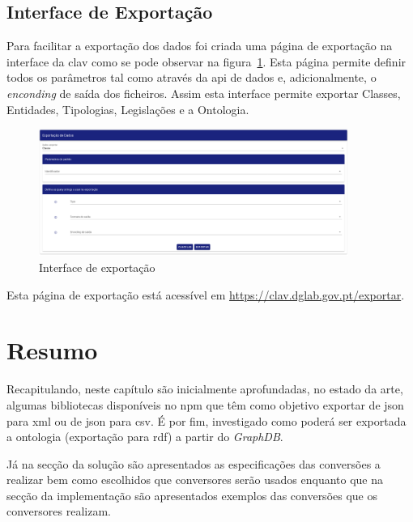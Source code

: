 \subsection{Interface de Exportação}

Para facilitar a exportação dos dados foi criada uma página de exportação na interface da \acrshort{clav} como se pode observar na figura~\ref{fig:paginaExportacao}. Esta página permite definir todos os parâmetros tal como através da \acrshort{api} de dados e, adicionalmente, o \textit{enconding} de saída dos ficheiros. Assim esta interface permite exportar Classes, Entidades, Tipologias, Legislações e a Ontologia.

\begin{figure}[H]
    \centering
    \includegraphics[width=0.9\textwidth]{img/paginaExportacao.png}
    \caption{Interface de exportação\label{fig:paginaExportacao}}
\end{figure}

Esta página de exportação está acessível em \url{https://clav.dglab.gov.pt/exportar}.

\section{Resumo}

Recapitulando, neste capítulo são inicialmente aprofundadas, no estado da arte, algumas bibliotecas disponíveis no \acrshort{npm} que têm como objetivo exportar de \acrshort{json} para \acrshort{xml} ou de \acrshort{json} para \acrshort{csv}. É por fim, investigado como poderá ser exportada a ontologia (exportação para \acrshort{rdf}) a partir do \textit{GraphDB}.

Já na secção da solução são apresentados as especificações das conversões a realizar bem como escolhidos que conversores serão usados enquanto que na secção da implementação são apresentados exemplos das conversões que os conversores realizam.

